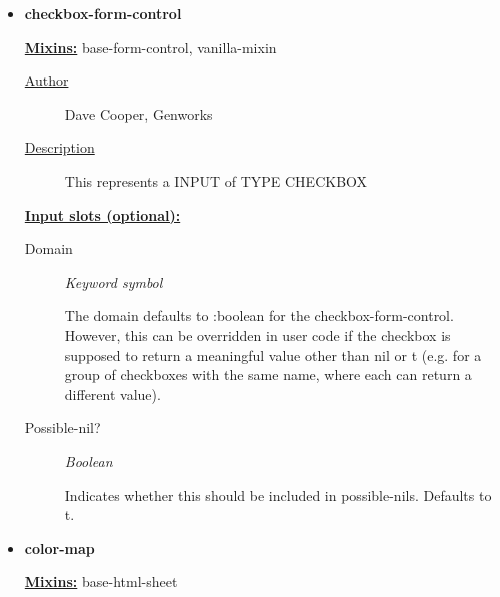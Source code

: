 \documentclass [11pt]{book}
\begin{document}
\begin{itemize}
\item {}
\label{prim:checkbox-form-control}
\textbf{checkbox-form-control}


\textbf{
\underline{Mixins:}} base-form-control, vanilla-mixin





\begin{description}

\item [
\underline{Author}]


Dave Cooper, Genworks



\item [
\underline{Description}]


This represents a INPUT of TYPE CHECKBOX



\end{description}








\textbf{
\underline{Input slots (optional):}}

\begin{description}

\item [Domain]
\emph{Keyword symbol}

 The domain defaults to :boolean for the checkbox-form-control.
However, this can be overridden in user code if the checkbox is supposed to return
a meaningful value other than nil or t (e.g. for a group of checkboxes with
the same name, where each can return a different value).




\item [Possible-nil?]
\emph{Boolean}

 Indicates whether this should be included in possible-nils. Defaults to t.




\end{description}







\item {}
\label{prim:color-map}
\textbf{color-map}


\textbf{
\underline{Mixins:}} base-html-sheet






\end{itemize}
\end{document}
